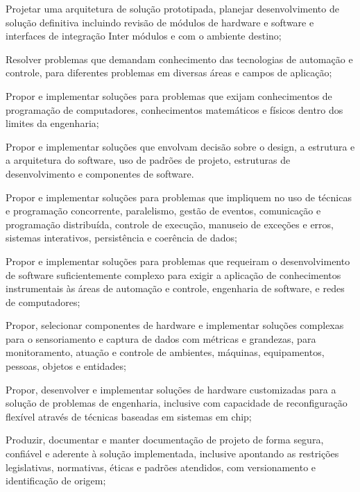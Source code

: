 \begin{compitem}
    \item Projetar uma arquitetura de solução prototipada, planejar desenvolvimento de solução definitiva incluindo revisão de módulos de hardware e software e interfaces de integração Inter módulos e com o ambiente destino;
    \item Resolver problemas que demandam conhecimento das tecnologias de automação e controle, para diferentes problemas em diversas áreas e campos de aplicação;
    \item Propor e implementar soluções para problemas que exijam conhecimentos de programação de computadores, conhecimentos matemáticos e físicos dentro dos limites da engenharia;
    \item Propor e implementar soluções que envolvam decisão sobre o design, a estrutura e a arquitetura do software, uso de padrões de projeto, estruturas de desenvolvimento e componentes de software.
    \item Propor e implementar soluções para problemas que impliquem no uso de técnicas e programação concorrente, paralelismo, gestão de eventos, comunicação e programação distribuída, controle de execução, manuseio de exceções e erros, sistemas interativos, persistência e coerência de dados;
    \item Propor e implementar soluções para problemas que requeiram o desenvolvimento de software suficientemente complexo para exigir a aplicação de conhecimentos instrumentais às áreas de automação e controle, engenharia de software, e redes de computadores;
    \item Propor, selecionar componentes de hardware e implementar soluções complexas para o sensoriamento e captura de dados com métricas e grandezas, para monitoramento, atuação e controle de ambientes, máquinas, equipamentos, pessoas, objetos e entidades;
    \item Propor, desenvolver e implementar soluções de hardware customizadas para a solução de problemas de engenharia, inclusive com capacidade de reconfiguração flexível através de técnicas baseadas em sistemas em chip;
    \item Produzir, documentar e manter documentação de projeto de forma segura, confiável e aderente à solução implementada, inclusive apontando as restrições legislativas, normativas, éticas e padrões atendidos, com versionamento e identificação de origem;
\end{compitem}

